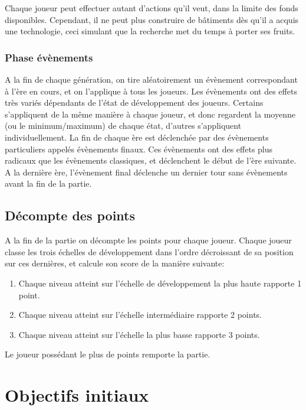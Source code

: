 \documentclass[12pt,twoside,a4paper]{article}
\begin{document}
Chaque joueur peut effectuer autant d'actions qu'il veut, dans la limite des fonds disponibles. Cependant, il ne peut plus construire de b\^atiments d\`es qu'il a acquis une technologie, ceci simulant que la recherche met du temps \`a porter ses fruits.

\subsubsection{Phase \'ev\`enements}

A la fin de chaque g\'en\'eration, on tire al\'eatoirement un \'ev\`enement correspondant \`a l'\`ere en cours, et on l'applique \`a tous les joueurs. Les \'ev\`enements ont des effets tr\`es vari\'es d\'ependants de l'\'etat de d\'eveloppement des joueurs. Certains s'appliquent de la m\^eme mani\`ere \`a chaque joueur, et donc regardent la moyenne (ou le minimum/maximum) de chaque \'etat, d'autres s'appliquent individuellement.
La fin de chaque \`ere est d\'eclench\'ee par des \'ev\`enements particuliers appel\'es \'ev\`enements finaux. Ces \'ev\`enements ont des effets plus radicaux que les \'ev\`enements classiques, et d\'eclenchent le d\'ebut de l'\`ere suivante. A la derni\`ere \`ere, l'\'ev\`enement final d\'eclenche un dernier tour sans \'ev\`enements avant la fin de la partie.

\subsection{D\'ecompte des points}

A la fin de la partie on d\'ecompte les points pour chaque joueur. Chaque joueur classe les trois \'echelles de d\'eveloppement dans l'ordre d\'ecroissant de sa position sur ces derni\`eres, et calcule son score de la mani\`ere suivante:

\begin{enumerate}
\item Chaque niveau atteint sur l'\'echelle de d\'eveloppement la plus haute rapporte 1 point.
\item Chaque niveau atteint sur l'\'echelle interm\'ediaire rapporte 2 points.
\item Chaque niveau atteint sur l'\'echelle la plus basse rapporte 3 points.
\end{enumerate}

\noindent Le joueur poss\'edant le plus de points remporte la partie.


\section{Objectifs initiaux}
\end{document}
